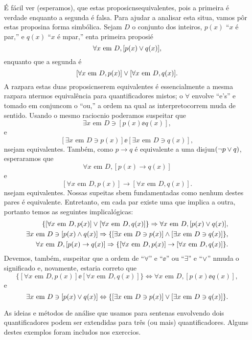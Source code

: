\'E f\'acil ver (esperamos), que estas proposic\oes n\ao s\ao equivalentes, pois a primeira \'e verdade enquanto a segunda \'e falsa. Para ajudar a analisar esta situa\caoi, vamos p\^or estas proposi\coes na forma simb\'olica. Sejam $D$ o conjunto dos inteiros, $p(x)$ ``$x$ \'e par,'' e $q(x)$ ``$x$ \'e \ih mpar,'' ent\ao a primeira proposi\cao \'e
\[
\forall x \textrm{ em } D, [p(x)\vee q(x)],
\]
enquanto que a segunda \'e
\[
[\forall x \textrm{ em } D, p(x)]\vee[\forall x \textrm{ em } D, q(x)].
\]
A raz\ao para estas duas proposic\oes n\ao serem equivalentes \'e essencialmente a mesma raz\ao para n\ao termos equival\^encia para quantificadores mistos; o $\forall$ envolve ``e's'' e tomado em conjun\cao com o ``ou,'' a ordem na qual as interpret\coes ocorrem muda de sentido. Usando o mesmo racioc\ih nio poder\ih amos suspeitar que
\[
\exists x \textrm{ em } D \ni [p(x)\ee q(x)],
\]
e
\[
[\exists x \textrm{ em } D \ni p(x)]\ee[\exists x \textrm{ em } D \ni q(x)],
\]
n\ao sejam equivalentes. Tamb\'em, como $p\to q$ \'e equivalente a uma disjun\cao $(\lnot p \vee q)$, esperar\ih amos que
\[
\forall x \textrm{ em } D, [p(x)\to q(x)]
\]
e
\[
[\forall x \textrm{ em } D, p(x)]\to[\forall x \textrm{ em } D, q(x)].
\] 
n\ao sejam equivalentes. Nossas supeitas s\ao bem fundamentadas como nenhum destes pares \'e equivalente. Entretanto, em cada par existe uma que implica a outra, portanto temos as seguintes implica\coes l\'ogicas:
\begin{eqnarray*}
\{[\forall x \textrm{ em } D, p(x)]\vee[\forall x \textrm{ em } D, q(x)]\} \Rightarrow \forall x \textrm{ em } D, [p(x)\vee q(x)],\\
\exists x \textrm{ em } D \ni [p(x)\wedge q(x)] \Rightarrow \{[\exists x \textrm{ em } D \ni p(x)]\wedge[\exists x \textrm{ em } D \ni q(x)]\}, \\
\forall x \textrm{ em } D, [p(x)\to q(x)] \Rightarrow \{[\forall x \textrm{ em } D, p(x)]\to[\forall x \textrm{ em } D, q(x)]\}.
\end{eqnarray*} 
Devemos, tamb\'em, suspeitar que a ordem de ``$\forall$'' e ``$\ee$'' ou ``$\exists$'' e ``$\vee$'' n\ao muda o significado e, novamente, estaria correto que
\[
\{[\forall x \textrm{ em } D, p(x)]\ee[\forall x \textrm{ em } D, q(x)]\} \Leftrightarrow \forall x \textrm{ em } D, [p(x)\ee q(x)],
\]
e
\[
\exists x \textrm{ em } D \ni [p(x)\vee q(x)] \Leftrightarrow \{[\exists x \textrm{ em } D \ni p(x)]\vee[\exists x \textrm{ em } D \ni q(x)]\}.
\]

As ideias e m\'etodos de an\'alise que usamos para senten\cc as envolvendo dois quantificadores podem ser extendidas para tr\^es (ou mais) quantificadores. Alguns destes exemplos foram inclu\ih dos nos exerc\ih cios.


